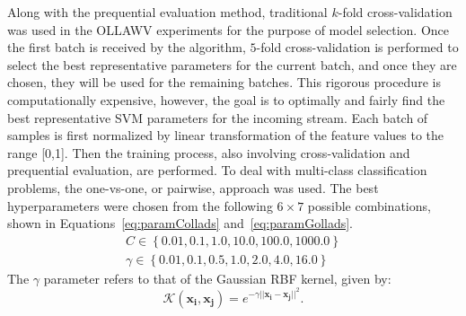 \documentclass[reqno]{vcuthesis}
\newcommand{\set}[1]{{\left\{#1\right\}}}
\newcommand{\norm}[1]{{||#1||}}
\numberwithin{equation}{chapter}
\begin{document}
Along with the prequential evaluation method, traditional $k$-fold cross-validation was used in the OLLAWV experiments for the purpose of model selection. Once the first batch is received by the algorithm, $5$-fold cross-validation is performed to select the best representative parameters for the current batch, and once they are chosen, they will be used for the remaining batches. This rigorous procedure is computationally expensive, however, the goal is to optimally and fairly find the best representative SVM parameters for the incoming stream. Each batch of samples is first normalized by linear transformation of the feature values to the range [0,1]. Then the training process, also involving cross-validation and prequential evaluation, are performed. To deal with multi-class classification problems, the one-vs-one, or pairwise, approach was used. The best hyperparameters were chosen from the following $6 \times 7$ possible combinations, shown in Equations~\eqref{eq:paramCollads} and~\eqref{eq:paramGollads}. 
\begin{subequations}
\label{eq:hyperparamollads}
\begin{align}
C \in \set{0.01, 0.1, 1.0, 10.0, 100.0, 1000.0} \label{eq:paramCollads}\\
\gamma \in \set{0.01, 0.1, 0.5, 1.0, 2.0, 4.0, 16.0} \label{eq:paramGollads}
\end{align}
\end{subequations}
The $\gamma$ parameter refers to that of the Gaussian RBF kernel, given by:
\begin{equation}
\label{eq:rbfds}
\mathcal{K}(\bm{x_i},\bm{x_j}) = e^{-\gamma\norm{\bm{x_i} - \bm{x_j}}^2}.
\end{equation}
\end{document}
